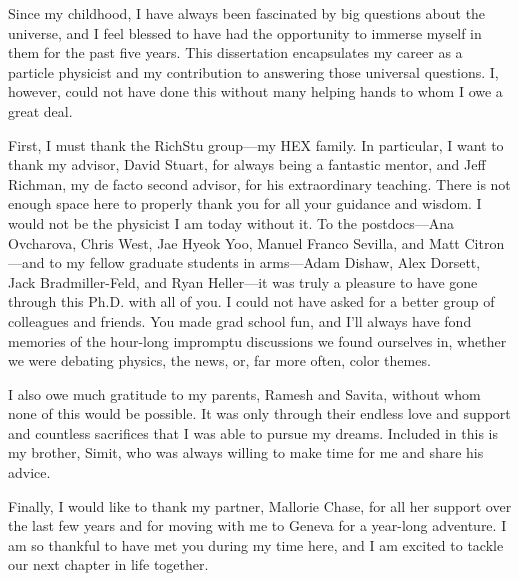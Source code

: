 \begin{acknowledgements}

Since my childhood, I have always been fascinated by big questions about the universe, and I feel blessed to have had the opportunity to immerse myself in them for the past five years.
This dissertation encapsulates my career as a particle physicist and my contribution to answering those universal questions.
I, however, could not have done this without many helping hands to whom I owe a great deal.

First, I must thank the RichStu group---my HEX family. 
In particular, I want to thank my advisor, David Stuart, for always being a fantastic mentor, and Jeff Richman, my de facto second advisor, for his extraordinary teaching.
There is not enough space here to properly thank you for all your guidance and wisdom.
I would not be the physicist I am today without it.
To the postdocs---Ana Ovcharova, Chris West, Jae Hyeok Yoo, Manuel Franco Sevilla, and Matt Citron---and to my fellow graduate students in arms---Adam Dishaw, Alex Dorsett, Jack Bradmiller-Feld, and Ryan Heller---it was truly a pleasure to have gone through this Ph.D. with all of you.
I could not have asked for a better group of colleagues and friends.
You made grad school fun, and I'll always have fond memories of the hour-long impromptu discussions we found ourselves in, whether we were debating physics, the news, or, far more often, color themes.

I also owe much gratitude to my parents, Ramesh and Savita, without whom none of this would be possible.
It was only through their endless love and support and countless sacrifices that I was able to pursue my dreams.
Included in this is my brother, Simit, who was always willing to make time for me and share his advice.

Finally, I would like to thank my partner, Mallorie Chase, for all her support over the last few years and for moving with me to Geneva for a year-long adventure.
I am so thankful to have met you during my time here, and I am excited to tackle our next chapter in life together.

\end{acknowledgements} 
